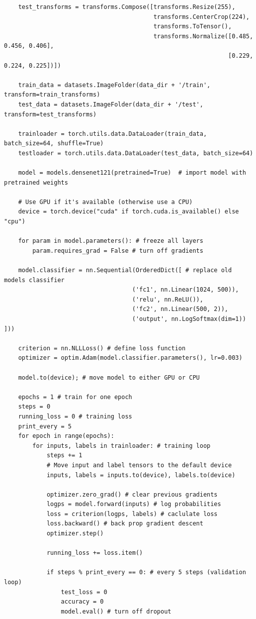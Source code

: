 \documentclass[11pt, a4paper]{article}
\begin{document}
\begin{spacing}{1.1}
\begin{lstlisting}
	test_transforms = transforms.Compose([transforms.Resize(255),
	                                      transforms.CenterCrop(224),
	                                      transforms.ToTensor(),
	                                      transforms.Normalize([0.485, 0.456, 0.406],
	                                                           [0.229, 0.224, 0.225])])
	
	train_data = datasets.ImageFolder(data_dir + '/train', transform=train_transforms)
	test_data = datasets.ImageFolder(data_dir + '/test', transform=test_transforms)
	
	trainloader = torch.utils.data.DataLoader(train_data, batch_size=64, shuffle=True)
	testloader = torch.utils.data.DataLoader(test_data, batch_size=64)
	
	model = models.densenet121(pretrained=True)  # import model with pretrained weights
	
	# Use GPU if it's available (otherwise use a CPU)
	device = torch.device("cuda" if torch.cuda.is_available() else "cpu")
	
	for param in model.parameters(): # freeze all layers
		param.requires_grad = False # turn off gradients
	
	model.classifier = nn.Sequential(OrderedDict([ # replace old models classifier
	                                ('fc1', nn.Linear(1024, 500)),
	                                ('relu', nn.ReLU()),
	                                ('fc2', nn.Linear(500, 2)),
	                                ('output', nn.LogSoftmax(dim=1)) ]))
	
	criterion = nn.NLLLoss() # define loss function
	optimizer = optim.Adam(model.classifier.parameters(), lr=0.003)
	
	model.to(device); # move model to either GPU or CPU
	
	epochs = 1 # train for one epoch
	steps = 0
	running_loss = 0 # training loss
	print_every = 5
	for epoch in range(epochs):
		for inputs, labels in trainloader: # training loop
			steps += 1
			# Move input and label tensors to the default device
			inputs, labels = inputs.to(device), labels.to(device)
			
			optimizer.zero_grad() # clear previous gradients
			logps = model.forward(inputs) # log probabilities
			loss = criterion(logps, labels) # caclulate loss
			loss.backward() # back prop gradient descent
			optimizer.step() 
			
			running_loss += loss.item()
			
			if steps % print_every == 0: # every 5 steps (validation loop)
				test_loss = 0
				accuracy = 0
				model.eval() # turn off dropout 
				\end{lstlisting}\newpage


\end{spacing}
\end{document}
